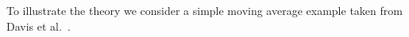 To illustrate the theory we consider a simple moving average example
taken from Davis et al.~\cite{davis:mikosch:pfaffel:2016}.
\begin{example} \rm
\begin{figure}[htb!]
  \centering
\end{figure}
\end{example}
